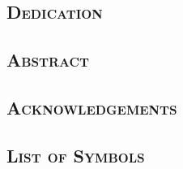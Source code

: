 \documentclass[a4paper,11pt,oneside,leqno,fleqn]{book} %
\theoremstyle{mythm}
\newcommand\blankpage{%
\null
\thispagestyle{empty}%
\newpage}
\def\biblio{}
\numberwithin{equation}{thm}
\begin{document}
\pagestyle{plain}

\def\biblio{}
\frontmatter

\clearpage
\setcounter{page}{1}

\doublespacing

\begin{center}\section*{\textsc{Dedication}}\end{center}

\cleartooddpage
{}
\begin{center}\section*{\textsc{Abstract}}\end{center}


\cleartooddpage
{}
\begin{center}\section*{\textsc{Acknowledgements}}\end{center}
\newpage
\blankpage


\cleartooddpage
\tableofcontents{}
\clearpage

\singlespace

\cleartooddpage
{}
\begin{center}\section*{\textsc{List of Symbols}}\end{center}
\clearpage
\end{document}
